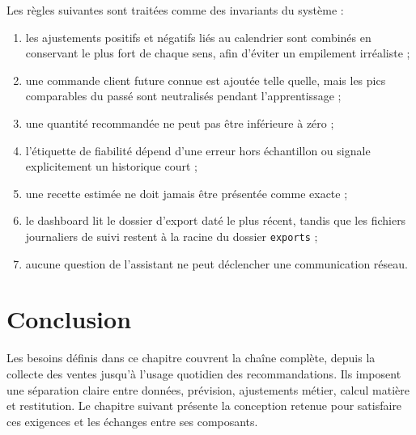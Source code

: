 Les règles suivantes sont traitées comme des invariants du système :

\begin{enumerate}
  \item les ajustements positifs et négatifs liés au calendrier sont combinés en
  conservant le plus fort de chaque sens, afin d'éviter un empilement irréaliste ;
  \item une commande client future connue est ajoutée telle quelle, mais les pics
  comparables du passé sont neutralisés pendant l'apprentissage ;
  \item une quantité recommandée ne peut pas être inférieure à zéro ;
  \item l'étiquette de fiabilité dépend d'une erreur hors échantillon ou signale
  explicitement un historique court ;
  \item une recette estimée ne doit jamais être présentée comme exacte ;
  \item le dashboard lit le dossier d'export daté le plus récent, tandis que les
  fichiers journaliers de suivi restent à la racine du dossier \texttt{exports} ;
  \item aucune question de l'assistant ne peut déclencher une communication
  réseau.
\end{enumerate}

\section{Conclusion}

Les besoins définis dans ce chapitre couvrent la chaîne complète, depuis la
collecte des ventes jusqu'à l'usage quotidien des recommandations. Ils imposent
une séparation claire entre données, prévision, ajustements métier, calcul matière
et restitution. Le chapitre suivant présente la conception retenue pour satisfaire
ces exigences et les échanges entre ses composants.

